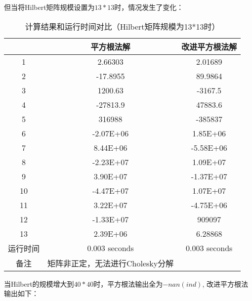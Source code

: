 \documentclass{article}
\begin{document}
但当将Hilbert矩阵规模设置为$13*13$时，情况发生了变化：
\begin{table}[H]
	\centering
	\begin{tabular}{ccc}
		\toprule
		& \textbf{平方根法解}        & \textbf{改进平方根法解} \\
		\midrule
	1	& 2.66303               & 2.01689          \\
	2	& -17.8955              & 89.9864          \\
	3	& 1200.63               & -3167.5          \\
	4	& -27813.9              & 47883.6          \\
	5	& 316988                & -385837          \\
	6	& -2.07E+06             & 1.85E+06         \\
	7	& 8.44E+06              & -5.58E+06        \\
	8	& -2.23E+07             & 1.09E+07         \\
	9	& 3.90E+07              & -1.37E+07        \\
	10	& -4.47E+07             & 1.07E+07         \\
	11	& 3.22E+07              & -4.75E+06        \\
	12	& -1.33E+07             & 909097           \\
	13	& 2.39E+06              & 6.28868          \\
		运行时间 & 0.003 seconds         & 0.003 seconds    \\
		备注   & 矩阵非正定，无法进行Cholesky分解 &             \\
		\bottomrule    
	\end{tabular}
	\caption{计算结果和运行时间对比（Hilbert矩阵规模为13*13时）}
\end{table}
\newpage
当Hilbert的规模增大到$40*40$时，平方根法输出全为$-nan(ind)$, 改进平方根法输出如下：
\end{document}
